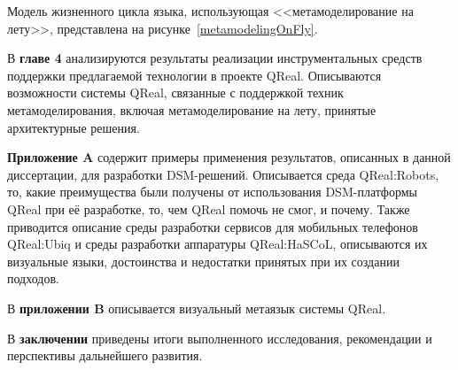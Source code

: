 Модель жизненного цикла языка, использующая <<метамоделирование на лету>>, представлена 
на рисунке~\ref{metamodelingOnFly}.

В \textbf{главе 4} анализируются результаты реализации инструментальных средств поддержки предлагаемой 
технологии в проекте QReal. Описываются возможности системы QReal, связанные с поддержкой 
техник метамоделирования, включая метамоделирование на лету, принятые архитектурные 
решения.

\textbf{Приложение A} содержит примеры применения результатов, описанных в данной 
диссертации, для разработки DSM-решений. Описывается среда QReal:Robots, то, какие 
преимущества были получены от использования DSM-платформы QReal при её разработке, 
то, чем QReal помочь не смог, и почему. Также приводится описание среды разработки 
сервисов для мобильных телефонов QReal:Ubiq и среды разработки аппаратуры QReal:HaSCoL, 
описываются их визуальные языки, достоинства и недостатки принятых при их создании подходов.

В \textbf{приложении B} описывается визуальный метаязык системы QReal.

В \textbf{заключении} приведены итоги выполненного исследования, рекомендации и перспективы дальнейшего развития.

